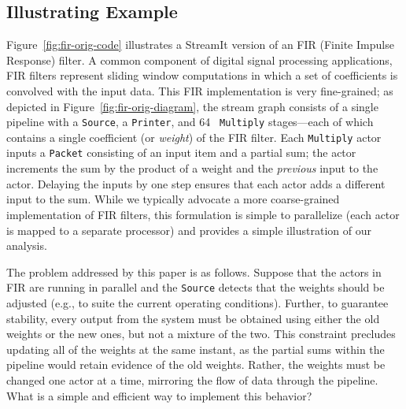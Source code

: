 				   

\subsection*{Illustrating Example}

Figure~\ref{fig:fir-orig-code} illustrates a StreamIt version of an
FIR (Finite Impulse Response) filter.  A common component of digital
signal processing applications, FIR filters represent sliding window
computations in which a set of coefficients is convolved with the
input data.  This FIR implementation is very fine-grained; as depicted
in Figure~\ref{fig:fir-orig-diagram}, the stream graph consists of a
single pipeline with a {\tt Source}, a {\tt Printer}, and 64 {\tt
Multiply} stages---each of which contains a single coefficient (or
{\it weight}) of the FIR filter.  Each {\tt Multiply} actor inputs a
{\tt Packet} consisting of an input item and a partial sum; the actor
increments the sum by the product of a weight and the {\it previous}
input to the actor.  Delaying the inputs by one step ensures that each
actor adds a different input to the sum.  While we typically advocate
a more coarse-grained implementation of FIR filters, this formulation
is simple to parallelize (each actor is mapped to a separate
processor) and provides a simple illustration of our analysis.

The problem addressed by this paper is as follows.  Suppose that the
actors in FIR are running in parallel and the {\tt Source} detects
that the weights should be adjusted (e.g., to suite the current
operating conditions).  Further, to guarantee stability, every output
from the system must be obtained using either the old weights or the
new ones, but not a mixture of the two.  This constraint precludes
updating all of the weights at the same instant, as the partial sums
within the pipeline would retain evidence of the old weights.  Rather,
the weights must be changed one actor at a time, mirroring the flow of
data through the pipeline.  What is a simple and efficient way to
implement this behavior?

